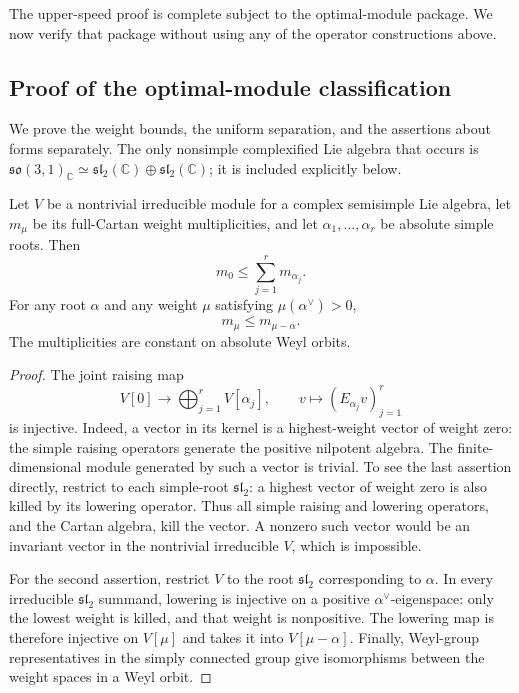The upper-speed proof is complete subject to the optimal-module package.
We now verify that package without using any of the operator constructions
above.

\subsection{Proof of the optimal-module classification}
\label{subsec:panels-module-proofs}

We prove the weight bounds, the uniform separation, and the assertions
about forms separately. The only nonsimple complexified Lie algebra
that occurs is
$\mathfrak{so}(3,1)_{\mathbb C}\simeq
\mathfrak{sl}_2(\mathbb C)\oplus\mathfrak{sl}_2(\mathbb C)$;
it is included explicitly below.

\begin{lemma}
\label{lem:panels-weight-multiplicities}
Let $V$ be a nontrivial irreducible module for a complex semisimple
Lie algebra, let $m_\mu$ be its full-Cartan weight multiplicities, and
let $\alpha_1,\ldots,\alpha_r$ be absolute simple roots. Then
\[
 m_0\leq\sum_{j=1}^r m_{\alpha_j}.
\]
For any root $\alpha$ and any weight $\mu$ satisfying
$\mu(\alpha^\vee)>0$,
\[
 m_\mu\leq m_{\mu-\alpha}.
\]
The multiplicities are constant on absolute Weyl orbits.
\end{lemma}

\begin{proof}
The joint raising map
\[
 V[0]\longrightarrow\bigoplus_{j=1}^r V[\alpha_j],
 \qquad v\longmapsto(E_{\alpha_j}v)_{j=1}^r
\]
is injective. Indeed, a vector in its kernel is a highest-weight
vector of weight zero: the simple raising operators generate the
positive nilpotent algebra. The finite-dimensional module generated
by such a vector is trivial. To see the last assertion directly,
restrict to each simple-root $\mathfrak{sl}_2$: a highest vector of
weight zero is also killed by its lowering operator. Thus all simple
raising and lowering operators, and the Cartan algebra, kill the
vector. A nonzero such vector would be an invariant vector in the
nontrivial irreducible $V$, which is impossible.

For the second assertion, restrict $V$ to the root
$\mathfrak{sl}_2$ corresponding to $\alpha$. In every irreducible
$\mathfrak{sl}_2$ summand, lowering is injective on a positive
$\alpha^\vee$-eigenspace: only the lowest weight is killed, and that
weight is nonpositive. The lowering map is therefore injective on
$V[\mu]$ and takes it into $V[\mu-\alpha]$. Finally, Weyl-group
representatives in the simply connected group give isomorphisms
between the weight spaces in a Weyl orbit.
\end{proof}

